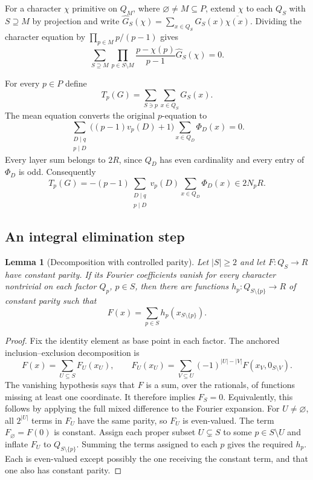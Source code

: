 \documentclass[11pt]{amsart}
\newtheorem{lemma}[theorem]{Lemma}
\theoremstyle{definition}
\theoremstyle{remark}
\numberwithin{equation}{section}
\begin{document}
For a character $\chi$ primitive on $Q_M$, where
$\varnothing\ne M\subseteq P$, extend $\chi$ to each $Q_S$ with
$S\supseteq M$ by projection and write
$\widehat G_S(\chi)=\sum_{x\in Q_S}G_S(x)\overline{\chi(x)}$.
Dividing the character equation by
$\prod_{p\in M}p/(p-1)$ gives
\begin{equation}\label{eq:global-A}
 \sum_{S\supseteq M}
 \prod_{p\in S\setminus M}\frac{p-\chi(p)}{p-1}
 \widehat G_S(\chi)=0.
\end{equation}

For every $p\in P$ define
\[
 T_p(G)=\sum_{S\ni p}\sum_{x\in Q_S}G_S(x).
\]
The mean equation converts the original $p$-equation to
\[
 \sum_{\substack{D\mid q\\p\mid D}}
 \bigl((p-1)v_p(D)+1\bigr)\sum_{x\in Q_D}\Phi_D(x)=0.
\]
Every layer sum belongs to $2R$, since $Q_D$ has even cardinality
and every entry of $\Phi_D$ is odd. Consequently
\begin{equation}\label{eq:global-T}
 T_p(G)=-(p-1)\sum_{\substack{D\mid q\\p\mid D}}
 v_p(D)\sum_{x\in Q_D}\Phi_D(x)\in 2N_pR.
\end{equation}

\subsection{An integral elimination step}

\begin{lemma}[Decomposition with controlled parity]
\label{lem:global-decomp}
Let $|S|\ge2$ and let $F:Q_S\to R$ have constant parity. If its
Fourier coefficients vanish for every character nontrivial on each
factor $Q_p$, $p\in S$, then there are functions
$h_p:Q_{S\setminus\{p\}}\to R$ of constant parity such that
\[
 F(x)=\sum_{p\in S}h_p(x_{S\setminus\{p\}}).
\]
\end{lemma}

\begin{proof}
Fix the identity element as base point in each factor. The anchored
inclusion--exclusion decomposition is
\[
 F(x)=\sum_{U\subseteq S}F_U(x_U),\qquad
 F_U(x_U)=\sum_{V\subseteq U}(-1)^{|U|-|V|}
 F(x_V,0_{S\setminus V}).
\]
The vanishing hypothesis says that $F$ is a sum, over the rationals,
of functions missing at least one coordinate. It therefore implies
$F_S=0$. Equivalently, this follows by applying the full mixed
difference to the Fourier expansion.
For $U\ne\varnothing$, all $2^{|U|}$ terms in $F_U$ have the same
parity, so $F_U$ is even-valued. The term $F_\varnothing=F(0)$ is
constant. Assign each proper subset $U\subsetneq S$ to some
$p\in S\setminus U$ and inflate $F_U$ to
$Q_{S\setminus\{p\}}$. Summing the terms assigned to each $p$
gives the required $h_p$. Each is even-valued except possibly the one
receiving the constant term, and that one also has constant parity.
\end{proof}
\end{document}
